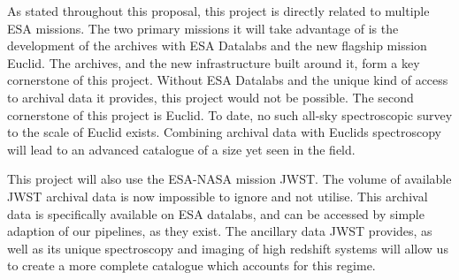 \documentclass[11pt]{article}
\begin{document}


\synergy
\vspace{-3mm}
As stated throughout this proposal, this project is directly related to multiple ESA missions. The two primary missions it will take advantage of is the development of the archives with ESA Datalabs and the new flagship mission Euclid. The archives, and the new infrastructure built around it, form a key cornerstone of this project. Without ESA Datalabs and the unique kind of access to archival data it provides, this project would not be possible. The second cornerstone of this project is Euclid. To date, no such all-sky spectroscopic survey to the scale of Euclid exists. Combining archival data with Euclids spectroscopy will lead to an advanced catalogue of a size yet seen in the field.

This project will also use the ESA-NASA mission JWST. The volume of available JWST archival data is now impossible to ignore and not utilise. This archival data is specifically available on ESA datalabs, and can be accessed by simple adaption of our pipelines, as they exist. The ancillary data JWST provides, as well as its unique spectroscopy and imaging of high redshift systems will allow us to create a more complete catalogue which accounts for this regime.
\end{document}
